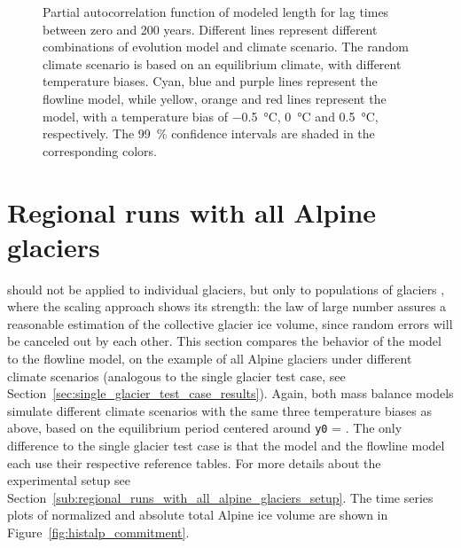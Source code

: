 \begin{figure}[htp]
        \caption{Partial autocorrelation function of modeled length for lag times between zero and 200 years. Different lines represent different combinations of evolution model and climate scenario.
        The random climate scenario is based on an equilibrium climate, with different temperature biases.
        Cyan, blue and purple lines represent the flowline model, while yellow, orange and red lines represent the \vas{} model, with a temperature bias of \SI{-.5}{\celsius}, \SI{0}{\celsius} and \SI{+.5}{\celsius}, respectively.
        The \SI{99}{\percent} confidence intervals are shaded in the corresponding colors.}
        \label{fig:pacf}
      \end{figure}



  \section{Regional runs with all Alpine glaciers} %
  \label{sec:regional_runs_with_all_alpine_glaciers_results}

    \Vas{} should not be applied to individual glaciers, but only to populations of glaciers \citep{Bahr2015}, where the scaling approach shows its strength: the law of large number assures a reasonable estimation of the collective glacier ice volume, since random errors will be canceled out by each other. This section compares the behavior of the \vas{} model to the flowline model, on the example of all Alpine glaciers under different climate scenarios (analogous to the single glacier test case, see Section~\ref{sec:single_glacier_test_case_results}).
    Again, both mass balance models simulate different climate scenarios with the same three temperature biases as above, based on the equilibrium period centered around \lstinline`y0` = \tstar{}. The only difference to the single glacier test case is that the \vas{} model and the flowline model each use their respective \tstar{} reference tables. For more details about the experimental setup see Section~\ref{sub:regional_runs_with_all_alpine_glaciers_setup}. The time series plots of normalized and absolute total Alpine ice volume are shown in Figure~\ref{fig:histalp_commitment}.

